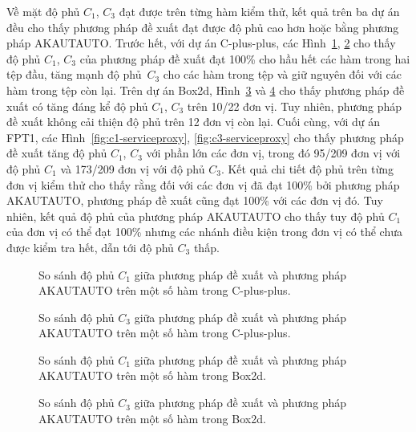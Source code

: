 Về mặt độ phủ $C_1$, $C_3$ đạt được trên từng hàm kiểm thử, kết quả trên ba dự án đều cho thấy phương pháp đề xuất đạt được độ phủ cao hơn hoặc bằng phương pháp AKAUTAUTO. Trước hết, với dự án C-plus-plus, các Hình~\ref{fig:c1-algo}, \ref{fig:c3-algo} cho thấy độ phủ $C_1$, $C_3$ của phương pháp đề xuất đạt 100\% cho hầu hết các hàm trong hai tệp đầu, tăng mạnh độ phủ~$C_3$ cho các hàm trong tệp  và giữ nguyên đối với các hàm trong tệp còn lại. Trên dự án Box2d, Hình~\ref{fig:c1-box2d} và \ref{fig:c3-box2d} cho thấy phương pháp đề xuất có tăng đáng kể độ phủ $C_1$, $C_3$ trên 10/22 đơn vị. Tuy nhiên, phương pháp đề xuất không cải thiện độ phủ trên 12 đơn vị còn lại. Cuối cùng, với dự án FPT1, các Hình~\ref{fig:c1-serviceproxy}, \ref{fig:c3-serviceproxy} cho thấy phương pháp đề xuất tăng độ phủ $C_1$, $C_3$ với phần lớn các đơn vị, trong đó 95/209 đơn vị với độ phủ $C_1$ và 173/209 đơn vị với độ phủ $C_3$. Kết quả chi tiết độ phủ trên từng đơn vị kiểm thử cho thấy rằng đối với các đơn vị đã đạt 100\% bởi phương pháp AKAUTAUTO, phương pháp đề xuất cũng đạt 100\% với các đơn vị đó. Tuy nhiên, kết quả độ phủ của phương pháp AKAUTAUTO cho thấy tuy độ phủ $C_1$ của đơn vị có thể đạt 100\% nhưng các nhánh điều kiện trong đơn vị có thể chưa được kiểm tra hết, dẫn tới độ phủ $C_3$ thấp. 

\begin{figure}[H]
    \centering
    
    \caption{So sánh độ phủ $C_1$ giữa phương pháp đề xuất và phương pháp AKAUTAUTO trên một số hàm trong C-plus-plus.}
    \label{fig:c1-algo}
\end{figure}

\begin{figure}[H]
    \centering
    
    \caption{So sánh độ phủ $C_3$ giữa phương pháp đề xuất và phương pháp AKAUTAUTO trên một số hàm trong C-plus-plus.}
    \label{fig:c3-algo}
\end{figure}

\begin{figure}[H]
	\centering
	
	\caption{So sánh độ phủ $C_1$ giữa phương pháp đề xuất và phương pháp AKAUTAUTO trên một số hàm trong Box2d.}
	\label{fig:c1-box2d}
\end{figure}

\begin{figure}[H]
	\centering
	
	\caption{So sánh độ phủ $C_3$ giữa phương pháp đề xuất và phương pháp AKAUTAUTO trên một số hàm trong Box2d.}
	\label{fig:c3-box2d}
\end{figure}

